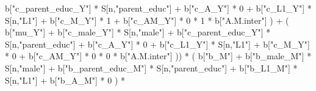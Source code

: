 \documentclass[
]{book}
\newenvironment{Shaded}{\begin{snugshade}}{\end{snugshade}}
\newcommand{\DecValTok}[1]{\textcolor[rgb]{0.00,0.00,0.81}{#1}}
\newcommand{\NormalTok}[1]{#1}
\newcommand{\SpecialCharTok}[1]{\textcolor[rgb]{0.00,0.00,0.00}{#1}}
\newcommand{\StringTok}[1]{\textcolor[rgb]{0.31,0.60,0.02}{#1}}
\begin{document}
\begin{Shaded}
\begin{Highlighting}[]
\NormalTok{                                 b[}\StringTok{"c\_parent\_educ\_Y"}\NormalTok{] }\SpecialCharTok{*}\NormalTok{ S[n,}\StringTok{"parent\_educ"}\NormalTok{] }\SpecialCharTok{+} 
\NormalTok{                                 b[}\StringTok{"c\_A\_Y"}\NormalTok{] }\SpecialCharTok{*} \DecValTok{0} \SpecialCharTok{+} 
\NormalTok{                                 b[}\StringTok{"c\_L1\_Y"}\NormalTok{] }\SpecialCharTok{*}\NormalTok{ S[n,}\StringTok{"L1"}\NormalTok{] }\SpecialCharTok{+}
\NormalTok{                                 b[}\StringTok{"c\_M\_Y"}\NormalTok{] }\SpecialCharTok{*} \DecValTok{1} \SpecialCharTok{+}
\NormalTok{                                 b[}\StringTok{"c\_AM\_Y"}\NormalTok{] }\SpecialCharTok{*} \DecValTok{0} \SpecialCharTok{*} \DecValTok{1} \SpecialCharTok{*}\NormalTok{ b[}\StringTok{"A.M.inter"}\NormalTok{] ) }\SpecialCharTok{+} 
\NormalTok{                             ( b[}\StringTok{"mu\_Y"}\NormalTok{] }\SpecialCharTok{+} 
\NormalTok{                                 b[}\StringTok{"c\_male\_Y"}\NormalTok{] }\SpecialCharTok{*}\NormalTok{ S[n,}\StringTok{"male"}\NormalTok{] }\SpecialCharTok{+} 
\NormalTok{                                 b[}\StringTok{"c\_parent\_educ\_Y"}\NormalTok{] }\SpecialCharTok{*}\NormalTok{ S[n,}\StringTok{"parent\_educ"}\NormalTok{] }\SpecialCharTok{+} 
\NormalTok{                                 b[}\StringTok{"c\_A\_Y"}\NormalTok{] }\SpecialCharTok{*} \DecValTok{0} \SpecialCharTok{+} 
\NormalTok{                                 b[}\StringTok{"c\_L1\_Y"}\NormalTok{] }\SpecialCharTok{*}\NormalTok{ S[n,}\StringTok{"L1"}\NormalTok{] }\SpecialCharTok{+}
\NormalTok{                                 b[}\StringTok{"c\_M\_Y"}\NormalTok{] }\SpecialCharTok{*} \DecValTok{0} \SpecialCharTok{+}
\NormalTok{                                 b[}\StringTok{"c\_AM\_Y"}\NormalTok{] }\SpecialCharTok{*} \DecValTok{0} \SpecialCharTok{*} \DecValTok{0} \SpecialCharTok{*}\NormalTok{ b[}\StringTok{"A.M.inter"}\NormalTok{] )) }\SpecialCharTok{*}
\NormalTok{      ( b[}\StringTok{"b\_M"}\NormalTok{] }\SpecialCharTok{+} 
\NormalTok{          b[}\StringTok{"b\_male\_M"}\NormalTok{] }\SpecialCharTok{*}\NormalTok{ S[n,}\StringTok{"male"}\NormalTok{] }\SpecialCharTok{+} 
\NormalTok{          b[}\StringTok{"b\_parent\_educ\_M"}\NormalTok{] }\SpecialCharTok{*}\NormalTok{ S[n,}\StringTok{"parent\_educ"}\NormalTok{] }\SpecialCharTok{+}
\NormalTok{          b[}\StringTok{"b\_L1\_M"}\NormalTok{] }\SpecialCharTok{*}\NormalTok{ S[n,}\StringTok{"L1"}\NormalTok{] }\SpecialCharTok{+}
\NormalTok{          b[}\StringTok{"b\_A\_M"}\NormalTok{] }\SpecialCharTok{*} \DecValTok{0}\NormalTok{ ) }\SpecialCharTok{*} 

\end{Highlighting}
\end{Shaded}
\end{document}
